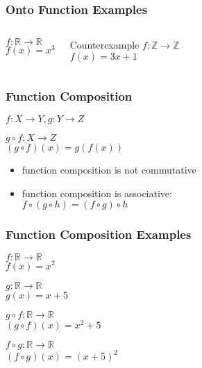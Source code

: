 \documentclass[dvipsnames]{beamer}
\begin{document}
\begin{frame}
  \frametitle{Onto Function Examples}

  \begin{columns}
    \begin{example}
      $f: \mathbb{R} \rightarrow \mathbb{R}$\\
      $f(x) = x^3$
    \end{example}

    \pause
    \begin{block}{Counterexample}
      $f: \mathbb{Z} \rightarrow \mathbb{Z}$\\
      $f(x) = 3x + 1$
    \end{block}
  \end{columns}
\end{frame}

\begin{frame}
  \frametitle{Function Composition}

  \begin{definition}
    $f: X \rightarrow Y, g: Y \rightarrow Z$

    \medskip
    $g \circ f: X \rightarrow Z$\\
    $(g \circ f)(x) = g(f(x))$
  \end{definition}

  \pause
  \begin{itemize}
    \item function composition is not commutative
    \item function composition is associative:\\
      $f \circ (g \circ h) = (f \circ g) \circ h$
  \end{itemize}
\end{frame}

\begin{frame}
  \frametitle{Function Composition Examples}

  \begin{example}[commutativity]
    $f: \mathbb{R} \rightarrow \mathbb{R}$\\
    $f(x) = x^2$

    \medskip
    $g: \mathbb{R} \rightarrow \mathbb{R}$\\
    $g(x) = x + 5$

    \pause
    \bigskip
    $g \circ f: \mathbb{R} \rightarrow \mathbb{R}$\\
    $(g \circ f)(x) = x^2 + 5$

    \pause
    \medskip
    $f \circ g: \mathbb{R} \rightarrow \mathbb{R}$\\
    $(f \circ g)(x) = (x + 5)^2$
  \end{example}
\end{frame}
\end{document}
